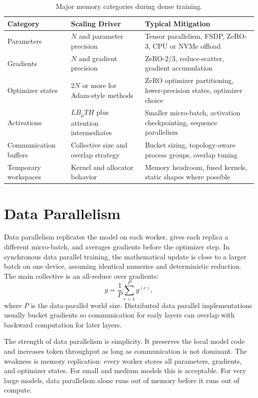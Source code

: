 \begin{table}[t]
\caption{Major memory categories during dense \llm training.}
\label{tab:training-memory-categories}
\small
\begin{tabular}{@{}p{2.9cm}p{4.3cm}p{4.6cm}@{}}
\toprule
Category & Scaling Driver & Typical Mitigation \\
\midrule
Parameters & $N$ and parameter precision & Tensor parallelism, FSDP, ZeRO-3, CPU or NVMe offload \\
Gradients & $N$ and gradient precision & ZeRO-2/3, reduce-scatter, gradient accumulation \\
Optimizer states & $2N$ or more for Adam-style methods & ZeRO optimizer partitioning, lower-precision states, optimizer choice \\
Activations & $L B_{\mu} T H$ plus attention intermediates & Smaller micro-batch, activation checkpointing, sequence parallelism \\
Communication buffers & Collective size and overlap strategy & Bucket sizing, topology-aware process groups, overlap tuning \\
Temporary workspaces & Kernel and allocator behavior & Memory headroom, fused kernels, static shapes where possible \\
\bottomrule
\end{tabular}
\end{table}

\section{Data Parallelism}
\label{sec:data-parallelism}

Data parallelism replicates the model on each worker, gives each replica a different micro-batch, and averages gradients before the optimizer step. In synchronous data parallel training, the mathematical update is close to a larger batch on one device, assuming identical numerics and deterministic reduction. The main collective is an all-reduce over gradients:
\begin{equation}
  g = \frac{1}{P}\sum_{r=1}^{P} g^{(r)},
\end{equation}
where $P$ is the data-parallel world size. Distributed data parallel implementations usually bucket gradients so communication for early layers can overlap with backward computation for later layers.

The strength of data parallelism is simplicity. It preserves the local model code and increases token throughput as long as communication is not dominant. The weakness is memory replication: every worker stores all parameters, gradients, and optimizer states. For small and medium models this is acceptable. For very large models, data parallelism alone runs out of memory before it runs out of compute.

